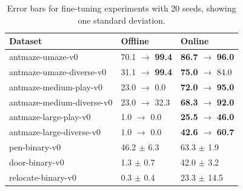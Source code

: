 \documentclass{article} %
\begin{document}
\begin{table}
\scriptsize
\begin{tabular}{ l ||p{1.5cm} | p{1.5cm}  }
    \centering
    Dataset & Offline & Online \\
    \hline
    antmaze-umaze-v0 & 70.1 \; $\rightarrow$ \textbf{99.4} & \textbf{86.7} \; $\rightarrow$ \textbf{96.0} \\
    antmaze-umaze-diverse-v0 & 31.1 \; $\rightarrow$ \textbf{99.4} & \textbf{75.0} \; $\rightarrow$ 84.0 \\
    antmaze-medium-play-v0 & 23.0 \; $\rightarrow$ 0.0 & \textbf{72.0} \; $\rightarrow$ \textbf{95.0} \\
    antmaze-medium-diverse-v0 & 23.0 \; $\rightarrow$ 32.3 & \textbf{68.3} \; $\rightarrow$ \textbf{92.0} \\
    antmaze-large-play-v0 & 1.0 \; \; $\rightarrow$ 0.0 & \textbf{25.5} \; $\rightarrow$ \textbf{46.0} \\
    antmaze-large-diverse-v0 & 1.0 \; \; $\rightarrow$ 0.0 & \textbf{42.6} \; $\rightarrow$ \textbf{60.7} \\ \hline
    pen-binary-v0 & 46.2 $\pm$ 6.3 & 63.3 \; $\pm$ 1.9 \\
    door-binary-v0 & 1.3 \; $\pm$ 0.7 & 42.0 \; $\pm$ 3.2 \\
    relocate-binary-v0 & 0.3 \; $\pm$ 0.4 & 23.3 \; $\pm$ 14.5 \\ \hline
\end{tabular}
\caption{Error bars for fine-tuning experiments with 20 seeds, showing one standard deviation.}
\label{tab:finetuning}
\end{table}
\end{document}

